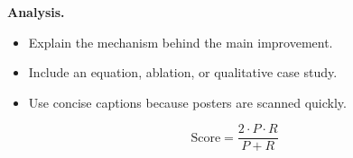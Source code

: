 \textbf{Analysis.}
\begin{itemize}
    \item Explain the mechanism behind the main improvement.
    \item Include an equation, ablation, or qualitative case study.
    \item Use concise captions because posters are scanned quickly.
\end{itemize}

\vspace{0.4cm}
\[
    \mathrm{Score}=\frac{2\cdot P\cdot R}{P+R}
\]
